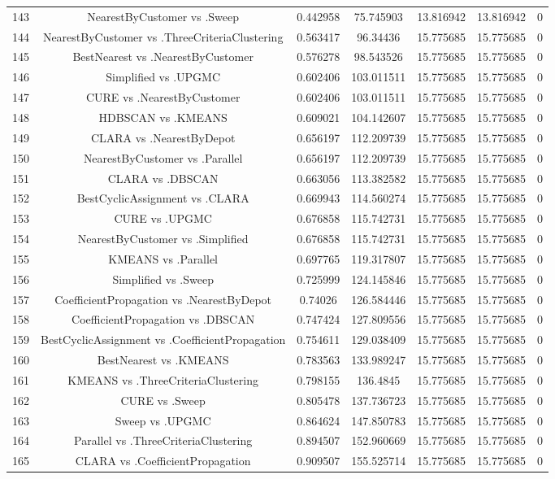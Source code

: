 \documentclass[a4paper,10pt]{article}
\begin{document}
\begin{landscape}
\begin{table}[!htp]
\begin{tabular}{ccccccc}
143&NearestByCustomer vs .Sweep&0.442958&75.745903&13.816942&13.816942&0\\
144&NearestByCustomer vs .ThreeCriteriaClustering&0.563417&96.34436&15.775685&15.775685&0\\
145&BestNearest vs .NearestByCustomer&0.576278&98.543526&15.775685&15.775685&0\\
146&Simplified vs .UPGMC&0.602406&103.011511&15.775685&15.775685&0\\
147&CURE vs .NearestByCustomer&0.602406&103.011511&15.775685&15.775685&0\\
148&HDBSCAN vs .KMEANS&0.609021&104.142607&15.775685&15.775685&0\\
149&CLARA vs .NearestByDepot&0.656197&112.209739&15.775685&15.775685&0\\
150&NearestByCustomer vs .Parallel&0.656197&112.209739&15.775685&15.775685&0\\
151&CLARA vs .DBSCAN&0.663056&113.382582&15.775685&15.775685&0\\
152&BestCyclicAssignment vs .CLARA&0.669943&114.560274&15.775685&15.775685&0\\
153&CURE vs .UPGMC&0.676858&115.742731&15.775685&15.775685&0\\
154&NearestByCustomer vs .Simplified&0.676858&115.742731&15.775685&15.775685&0\\
155&KMEANS vs .Parallel&0.697765&119.317807&15.775685&15.775685&0\\
156&Simplified vs .Sweep&0.725999&124.145846&15.775685&15.775685&0\\
157&CoefficientPropagation vs .NearestByDepot&0.74026&126.584446&15.775685&15.775685&0\\
158&CoefficientPropagation vs .DBSCAN&0.747424&127.809556&15.775685&15.775685&0\\
159&BestCyclicAssignment vs .CoefficientPropagation&0.754611&129.038409&15.775685&15.775685&0\\
160&BestNearest vs .KMEANS&0.783563&133.989247&15.775685&15.775685&0\\
161&KMEANS vs .ThreeCriteriaClustering&0.798155&136.4845&15.775685&15.775685&0\\
162&CURE vs .Sweep&0.805478&137.736723&15.775685&15.775685&0\\
163&Sweep vs .UPGMC&0.864624&147.850783&15.775685&15.775685&0\\
164&Parallel vs .ThreeCriteriaClustering&0.894507&152.960669&15.775685&15.775685&0\\
165&CLARA vs .CoefficientPropagation&0.909507&155.525714&15.775685&15.775685&0\\

\end{tabular}
\end{table}
\end{landscape}
\end{document}
